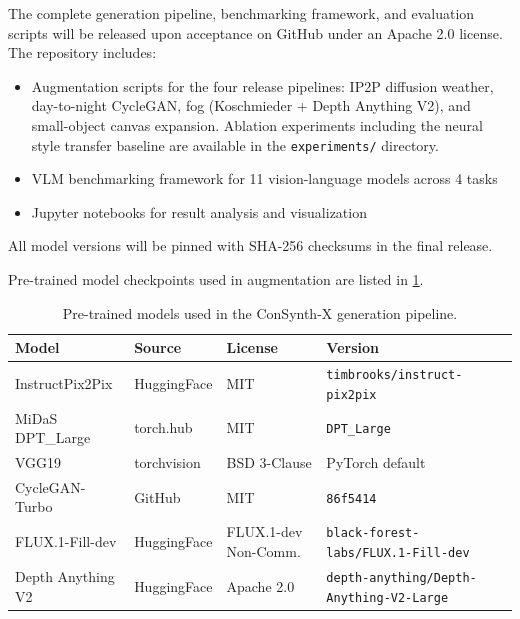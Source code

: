 \documentclass[12pt]{article}
\begin{document}
The complete generation pipeline, benchmarking framework, and evaluation scripts will be released upon acceptance on GitHub under an Apache 2.0 license. The repository includes:

\begin{itemize}[noitemsep]
    \item Augmentation scripts for the four release pipelines: IP2P diffusion weather, day-to-night CycleGAN, fog (Koschmieder + Depth Anything V2), and small-object canvas expansion. Ablation experiments including the neural style transfer baseline are available in the \texttt{experiments/} directory.
    \item VLM benchmarking framework for 11 vision-language models across 4 tasks
    \item Jupyter notebooks for result analysis and visualization
\end{itemize}

All model versions will be pinned with SHA-256 checksums in the final release.

Pre-trained model checkpoints used in augmentation are listed in \ref{tab:models}.

\begin{table}[H]
\centering
\caption{Pre-trained models used in the ConSynth-X generation pipeline.}
\label{tab:models}
\small
\begin{tabular}{llll}
\toprule
\textbf{Model} & \textbf{Source} & \textbf{License} & \textbf{Version} \\
\midrule
InstructPix2Pix    & HuggingFace & MIT         & \texttt{timbrooks/instruct-pix2pix} \\
MiDaS DPT\_Large   & torch.hub   & MIT         & \texttt{DPT\_Large} \\
VGG19              & torchvision & BSD 3-Clause & PyTorch default \\
CycleGAN-Turbo     & GitHub      & MIT         & \texttt{86f5414} \\
FLUX.1-Fill-dev    & HuggingFace & FLUX.1-dev Non-Comm. & \texttt{black-forest-labs/FLUX.1-Fill-dev} \\
Depth Anything V2  & HuggingFace & Apache 2.0  & \texttt{depth-anything/Depth-Anything-V2-Large} \\
\bottomrule
\end{tabular}
\end{table}


\end{document}
